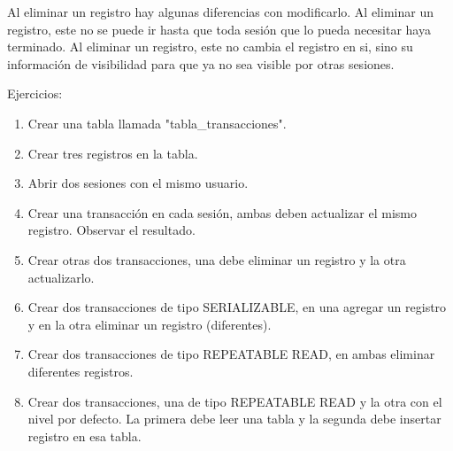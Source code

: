 Al eliminar un registro hay algunas diferencias con modificarlo. Al eliminar un registro, este no se puede ir hasta que toda sesión que lo pueda necesitar haya terminado. Al eliminar un registro, este no cambia el registro en si, sino su información de visibilidad para que ya no sea visible por otras sesiones.

\newpage

Ejercicios:

\begin{enumerate}
\item Crear una tabla llamada "tabla\_transacciones".
\item Crear tres registros en la tabla.
\item Abrir dos sesiones con el mismo usuario.
\item Crear una transacción en cada sesión, ambas deben actualizar el mismo registro. Observar el resultado.
\item Crear otras dos transacciones, una debe eliminar un registro y la otra actualizarlo.
\item Crear dos transacciones de tipo SERIALIZABLE, en una agregar un registro y en la otra eliminar un registro  (diferentes).
\item Crear dos transacciones de tipo REPEATABLE READ, en ambas eliminar diferentes registros.
\item Crear dos transacciones, una de tipo REPEATABLE READ y la otra con el nivel por defecto. La primera debe leer una tabla y la segunda debe insertar registro en esa tabla.
\end{enumerate}

